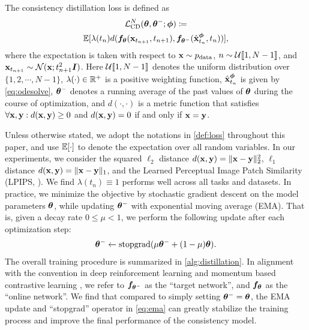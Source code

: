 \begin{definition}\label{def:loss}
The consistency distillation loss is defined as
\begin{multline}
    \mathcal{L}_\text{CD}^N({\bm{\theta}}, {\bm{\theta}}^{-}; {\bm{\phi}}) \coloneqq \\ \mathbb{E}[\lambda(t_n) d({\bm{f}}_{\bm{\theta}}({{\mathbf{x}}}_{t_{n+1}}, t_{n+1}), {\bm{f}}_{{\bm{\theta}}^-}(\hat{{\mathbf{x}}}_{t_n}^{\bm{\phi}}, t_n))], \label{eq:distill_obj}
\end{multline}
where the expectation is taken with respect to ${\mathbf{x}} \sim p_\text{data}$, $n \sim \mathcal{U}\llbracket 1,N-1 \rrbracket$, and ${\mathbf{x}}_{t_{n+1}} \sim \mathcal{N}({\mathbf{x}}; t_{n+1}^2 {\bm{I}})$. Here $\mathcal{U}\llbracket 1, N-1 \rrbracket$ denotes the uniform distribution over $\{1,2,\cdots, N-1\}$, $\lambda(\cdot) \in \mathbb{R}^+$ is a positive weighting function, $\hat{{\mathbf{x}}}_{t_n}^{\bm{\phi}}$ is given by \cref{eq:odesolve}, ${\bm{\theta}}^-$ denotes a running average of the past values of ${\bm{\theta}}$ during the course of optimization, and $d(\cdot, \cdot)$ is a metric function that satisfies $\forall {\mathbf{x}}, {\mathbf{y}}: d({\mathbf{x}}, {\mathbf{y}}) \geq 0$ and $d({\mathbf{x}}, {\mathbf{y}}) = 0$ if and only if ${\mathbf{x}} = {\mathbf{y}}$.
\end{definition}

Unless otherwise stated, we adopt the notations in \cref{def:loss} throughout this paper, and use $\mathbb{E}[\cdot]$ to denote the expectation over all random variables. In our experiments, we consider the squared $\ell_2$ distance $d({\mathbf{x}}, {\mathbf{y}}) = \|{\mathbf{x}} - {\mathbf{y}}\|^2_2$, $\ell_1$ distance $d({\mathbf{x}}, {\mathbf{y}}) = \|{\mathbf{x}}-{\mathbf{y}}\|_1$, and the Learned Perceptual Image Patch Similarity (LPIPS, \citet{zhang2018perceptual}). We find $\lambda(t_n) \equiv 1$ performs well across all tasks and datasets. In practice, we minimize the objective by stochastic gradient descent on the model parameters ${\bm{\theta}}$, while updating ${\bm{\theta}}^-$ with exponential moving average (EMA). That is, given a decay rate $0 \leq \mu < 1$, we perform the following update after each optimization step:
\begin{align}
    {\bm{\theta}}^- \leftarrow \operatorname{stopgrad}(\mu {\bm{\theta}}^- + (1-\mu) {\bm{\theta}}).\label{eq:ema}
\end{align}
The overall training procedure is summarized in \cref{alg:distillation}. In alignment with the convention in deep reinforcement learning \cite{mnih2013playing,mnih2015human,lillicrap2015continuous} and momentum based contrastive learning \cite{grill2020bootstrap,he2020momentum}, we refer to ${\bm{f}}_{{\bm{\theta}}^-}$ as the ``target network'', and ${\bm{f}}_{\bm{\theta}}$ as the ``online network''. We find that compared to simply setting ${\bm{\theta}}^- = {\bm{\theta}}$, the EMA update and ``stopgrad'' operator in \cref{eq:ema} can greatly stabilize the training process and improve the final performance of the consistency model.

